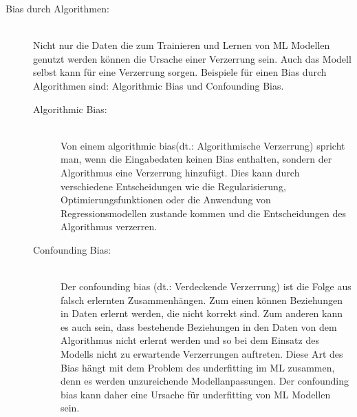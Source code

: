 \begin{onehalfspace}
\begin{description}
            \item [Bias durch Algorithmen:] \hfill \\
            Nicht nur die Daten die zum Trainieren und Lernen von \ac*{ML} Modellen genutzt werden können die Ursache einer Verzerrung sein. Auch das Modell selbst kann für eine Verzerrung sorgen. Beispiele für einen Bias durch Algorithmen sind: Algorithmic Bias und Confounding Bias.
            \begin{description}
                \item [Algorithmic Bias:] \hfill \\
                Von einem \glqq{}algorithmic bias\grqq{}(\ac*{dt}.: Algorithmische Verzerrung) spricht man, wenn die Eingabedaten keinen Bias enthalten, sondern der Algorithmus eine Verzerrung hinzufügt. Dies kann durch verschiedene Entscheidungen wie die Regularisierung, Optimierungsfunktionen oder die Anwendung von Regressionsmodellen zustande kommen und die Entscheidungen des Algorithmus verzerren.\cite{srinivasan2021biases}\cite{Mehrabi2021}
                \item [Confounding Bias:] \hfill \\
                Der \glqq{}confounding bias\grqq{} (\ac*{dt}.: Verdeckende Verzerrung) ist die Folge aus falsch erlernten Zusammenhängen. Zum einen können Beziehungen in Daten erlernt werden, die nicht korrekt sind. Zum anderen kann es auch sein, dass bestehende Beziehungen in den Daten von dem Algorithmus nicht erlernt werden und so bei dem Einsatz des Modells nicht zu erwartende Verzerrungen auftreten. Diese Art des Bias hängt mit dem Problem des underfitting im \ac*{ML} zusammen, denn es werden unzureichende Modellanpassungen. Der confounding bias kann daher eine Ursache für underfitting von \ac*{ML} Modellen sein.\cite{srinivasan2021biases}
            \end{description}
                

\end{description}
\end{onehalfspace}

